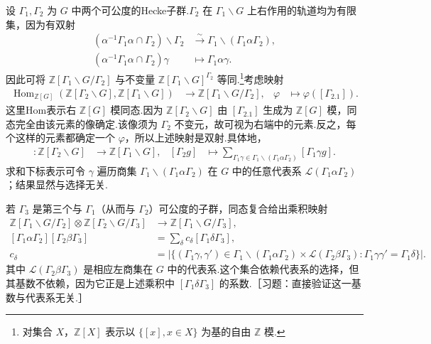设 $\Gamma_1,\Gamma_2$ 为 $G$ 中两个可公度的Hecke子群.$\Gamma_2$ 在 $\Gamma_1\backslash G$ 上右作用的轨道均为有限集，因为有双射
\begin{align*}
(\alpha^{-1}\Gamma_1\alpha\cap\Gamma_2)\backslash\Gamma_2&\xrightarrow{\sim}\Gamma_1\backslash(\Gamma_1\alpha\Gamma_2),\\
(\alpha^{-1}\Gamma_1\alpha\cap\Gamma_2)\gamma&\longmapsto\Gamma_1\alpha\gamma.
\end{align*}
因此可将 $\mathbb Z[\Gamma_1\backslash G/\Gamma_2]$ 与不变量 $\mathbb Z[\Gamma_1\backslash G]^{\Gamma_2}$ 等同.\footnote{对集合 $X$，$\mathbb Z[X]$ 表示以 $\{[x],x\in X\}$ 为基的自由 $\mathbb Z$ 模.}考虑映射
\begin{align*}
\operatorname{Hom}_{\mathbb Z[G]}(\mathbb Z[\Gamma_2\backslash G],\mathbb Z[\Gamma_1\backslash G])&\longrightarrow\mathbb Z[\Gamma_1\backslash G/\Gamma_2],&\varphi&\longmapsto\varphi([\Gamma_2.1]).
\end{align*}
这里Hom表示右 $\mathbb Z[G]$ 模同态.因为 $\mathbb Z[\Gamma_2\backslash G]$ 由 $[\Gamma_2.1]$ 生成为 $\mathbb Z[G]$ 模，同态完全由该元素的像确定.该像须为 $\Gamma_2$ 不变元，故可视为右端中的元素.反之，每个这样的元素都确定一个 $\varphi$，所以上述映射是双射.具体地，
\begin{align*}
[\Gamma_1\alpha\Gamma_2]:\mathbb Z[\Gamma_2\backslash G]&\longrightarrow\mathbb Z[\Gamma_1\backslash G],&[\Gamma_2g]&\longmapsto\sum_{\Gamma_1\gamma\in\Gamma_1\backslash(\Gamma_1\alpha\Gamma_2)}[\Gamma_1\gamma g].
\end{align*}
求和下标表示可令 $\gamma$ 遍历商集 $\Gamma_1\backslash(\Gamma_1\alpha\Gamma_2)$ 在 $G$ 中的任意代表系 $\mathcal L(\Gamma_1\alpha\Gamma_2)$；结果显然与选择无关.

若 $\Gamma_3$ 是第三个与 $\Gamma_1$（从而与 $\Gamma_2$）可公度的子群，同态复合给出乘积映射
\begin{align*}
\mathbb Z[\Gamma_1\backslash G/\Gamma_2]\otimes\mathbb Z[\Gamma_2\backslash G/\Gamma_3]&\longrightarrow\mathbb Z[\Gamma_1\backslash G/\Gamma_3],\\
[\Gamma_1\alpha\Gamma_2][\Gamma_2\beta\Gamma_3]&=\sum_\delta c_\delta[\Gamma_1\delta\Gamma_3],\\
c_\delta&=\big|\{(\Gamma_1\gamma,\gamma')\in\Gamma_1\backslash(\Gamma_1\alpha\Gamma_2)\times\mathcal L(\Gamma_2\beta\Gamma_3):\Gamma_1\gamma\gamma'=\Gamma_1\delta\}\big|.
\end{align*}
其中 $\mathcal L(\Gamma_2\beta\Gamma_3)$ 是相应左商集在 $G$ 中的代表系.这个集合依赖代表系的选择，但其基数不依赖，因为它正是上述乘积中 $[\Gamma_1\delta\Gamma_3]$ 的系数.［习题：直接验证这一基数与代表系无关.］

